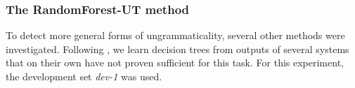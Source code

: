 \documentclass[a4paper,10pt]{scrartcl}
\theoremstyle{style}
\begin{document}




\subsubsection{The RandomForest-UT method}
To detect more general forms of ungrammaticality, several other methods were investigated. Following \cite{wagner2007comparative}, we learn decision trees from outputs of several systems that on their own have not proven sufficient for this task. For this experiment, the development set \textit{dev-1} was used.
\end{document}
